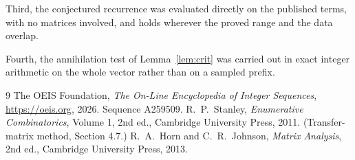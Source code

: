 \documentclass[11pt,a4paper]{article}
\theoremstyle{plain}
\theoremstyle{definition}
\begin{document}
Third, the conjectured recurrence was evaluated directly on the published terms, with no
matrices involved, and holds wherever the proved range and the data overlap.

Fourth, the annihilation test of Lemma~\ref{lem:crit} was carried out in exact integer
arithmetic on the whole vector rather than on a sampled prefix.

\begin{thebibliography}{9}
 The OEIS Foundation, \emph{The On-Line Encyclopedia of Integer
Sequences}, \url{https://oeis.org}, 2026. Sequence A259509.
 R.~P.~Stanley, \emph{Enumerative Combinatorics}, Volume 1, 2nd ed.,
Cambridge University Press, 2011. (Transfer-matrix method, Section 4.7.)
 R.~A.~Horn and C.~R.~Johnson, \emph{Matrix Analysis}, 2nd ed., Cambridge
University Press, 2013.
\end{thebibliography}
\end{document}
